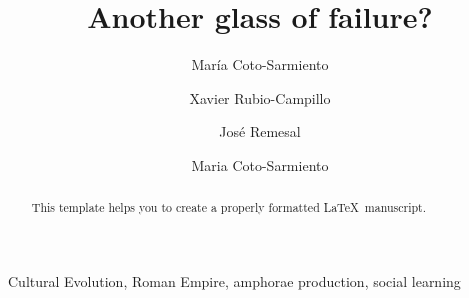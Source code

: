\documentclass[review]{elsarticle}
\begin{document}
\begin{frontmatter}

\title{Another glass of failure? }


\author{Mar\'ia Coto-Sarmiento}
\author{Xavier Rubio-Campillo}
\author{Jos\'e Remesal}
\address{Radarweg 29, Amsterdam}


\author[mysecondaryaddress]{Maria Coto-Sarmiento}

\address[mymainaddress]{1600 John F Kennedy Boulevard, Philadelphia}
\address[mysecondaryaddress]{360 Park Avenue South, New York}

\begin{abstract}
This template helps you to create a properly formatted \LaTeX\ manuscript.
\end{abstract}

\begin{keyword}
Cultural Evolution, Roman Empire, amphorae production, social learning
\end{keyword}

 \end{frontmatter}

\linenumbers



\end{document}
